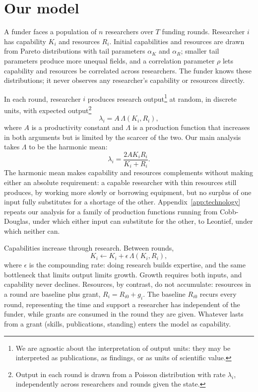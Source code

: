 \documentclass[article, 11pt, reqno]{amsart}
\theoremstyle{named}
\begin{document}
\section{Our model}\label{sec:model}

A funder faces a population of $n$ researchers over $T$ funding rounds. Researcher $i$ has capability $K_i$ and resources $R_i$. Initial capabilities and resources are drawn from Pareto distributions with tail parameters $\alpha_K$ and $\alpha_R$; smaller tail parameters produce more unequal fields, and a correlation parameter $\rho$ lets capability and resources be correlated across researchers. The funder knows these distributions; it never observes any researcher's capability or resources directly.

In each round, researcher $i$ produces research output\footnote{We are agnostic about the interpretation of output units: they may be interpreted as publications, as findings, or as units of scientific value.} at random, in discrete units, with expected output\footnote{Output in each round is drawn from a Poisson distribution with rate $\lambda_i$, independently across researchers and rounds given the state.}
\[
\lambda_i = A\,\Lambda(K_i, R_i),
\]
where $A$ is a productivity constant and $\Lambda$ is a production function that increases in both arguments but is limited by the scarcer of the two. Our main analysis takes $\Lambda$ to be the harmonic mean:
\[
\lambda_i = \frac{2A K_i R_i}{K_i + R_i}.
\]
The harmonic mean makes capability and resources complements without making either an absolute requirement: a capable researcher with thin resources still produces, by working more slowly or borrowing equipment, but no surplus of one input fully substitutes for a shortage of the other. Appendix~\ref{app:technology} repeats our analysis for a family of production functions running from Cobb-Douglas, under which either input can substitute for the other, to Leontief, under which neither can.

Capabilities increase through research. Between rounds,
\[
K_i \leftarrow K_i + \epsilon\,\Lambda(K_i, R_i),
\]
where $\epsilon$ is the compounding rate: doing research builds expertise, and the same bottleneck that limits output limits growth. Growth requires both inputs, and capability never declines. Resources, by contrast, do not accumulate: resources in a round are baseline plus grant, $R_i = R_{i0} + g_i$. The baseline $R_{i0}$ recurs every round, representing the time and support a researcher has independent of the funder, while grants are consumed in the round they are given. Whatever lasts from a grant (skills, publications, standing) enters the model as capability.
\end{document}
